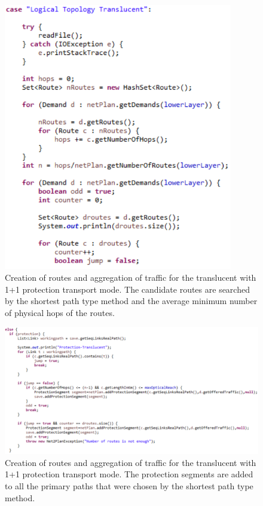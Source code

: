 \begin{figure}[H]
\centering
\includegraphics[width=10cm]{sdf/heuristic/translucent_protection/figures/grooming_translucent_protec1}
\caption{Creation of routes and aggregation of traffic for the translucent with 1+1 protection transport mode. The candidate routes are searched by the shortest path type method and the average minimum number of physical hops of the routes.}
\label{grooming_translucent_protec1}
\end{figure}

\begin{figure}[H]
\centering
\includegraphics[width=17cm]{sdf/heuristic/translucent_protection/figures/grooming_translucent_protec2}
\caption{Creation of routes and aggregation of traffic for the translucent with 1+1 protection transport mode. The protection segments are added to all the primary paths that were chosen by the shortest path type method.}
\label{grooming_translucent_protec2}
\end{figure}

